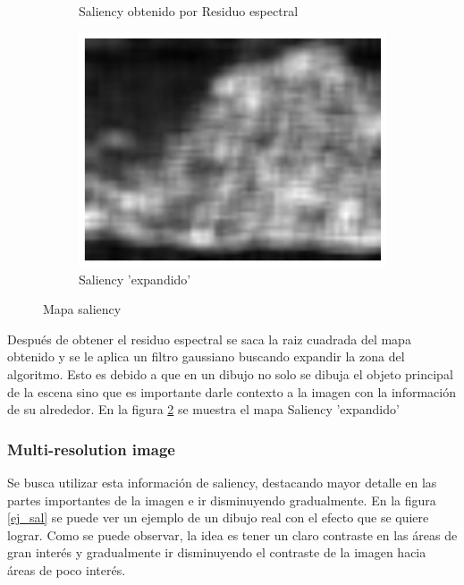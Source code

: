 \documentclass[letterpaper, 10 pt, conference]{ieeeconf}  %
\begin{document}
\begin{figure}[H]
\begin{subfigure}{0.45\linewidth}
    \caption{Saliency obtenido por Residuo espectral}
\label{fig:1a}
    \end{subfigure}\hfill
    \begin{subfigure}{0.45\linewidth}
\includegraphics[width=\linewidth, scale=0.05]{images/saliency2.png}
    \caption{Saliency 'expandido'}
\label{saliency}
    \end{subfigure}
\caption{Mapa saliency}
    \label{fig:1}
    \end{figure}


Después de obtener el residuo espectral se saca la raiz cuadrada del mapa obtenido y se le aplica un filtro gaussiano buscando expandir la zona del algoritmo. Esto es debido a que en un dibujo no solo se dibuja el objeto principal de la escena sino que es importante darle contexto a la imagen con la información de su alrededor. En la figura \ref{saliency} se muestra el mapa Saliency 'expandido'



\subsubsection{Multi-resolution image}
Se busca utilizar esta información de saliency, destacando mayor detalle en las partes importantes de la imagen e ir disminuyendo gradualmente. En la figura \ref{ej_sal} se puede ver un ejemplo de un dibujo real con el efecto que se quiere lograr. Como se puede observar, la idea es tener un claro contraste en las áreas de gran interés y gradualmente ir disminuyendo el contraste de la imagen hacia áreas de poco interés.
\end{document}

